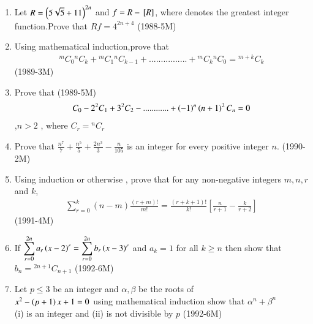 \documentclass[journal,12pt,twocolumn]{IEEEtran}
\theoremstyle{remark}
\begin{document}
\begin{enumerate}
	    \item Let $ R =\left(5\sqrt{5}+11\right)^{2n} $ and $ f = R -{}\left[R\right] $, where \sbrak{} denotes the greatest integer function.Prove  that $ Rf =4^{2n+4 } $  \hfill {(1988-5M)}


	    \item Using mathematical induction,prove that
		    \begin{align*} {}^mC_0{}^nC_k +{}^mC_1{}^nC_{k-1}+................+{}^mC_k{}^nC_0 ={}^{m+k}C_k \end{align*}  \hfill{(1989-3M)}


	    \item Prove that \hfill{(1989-5M)}
		    \begin{align*} 
		    C_0-2^2C_1+3^2C_2-............+\left(-1\right)^n\left(n+1\right)^2C_n =0
		    \end{align*},$n>2$ , where $C_r={}^nC_r$
		    

	    \item Prove that   $ \frac{n^7}{7}+\frac{n^5}{5}+\frac{2n^3}{3}-\frac{n}{105}$ is an integer for every positive integer $ n$. \hfill{(1990-2M)}


	    \item Using induction or otherwise , prove that for any non-negative integers $m,n,r$ and $ k$,
		    \begin{align*} 
			    \sum_{r=0}^{k}(n-m)\frac{(r+m)!}{m!}= \frac{(r+k+1)!}{k!}[\frac{n}{r+1}-\frac{k}{r+2}]
		    \end{align*}
		     \hfill{(1991-4M)} 

	     \item If $ \displaystyle\sum_{r=0}^{2n} a_r \left(x-2\right)^r=\displaystyle\sum_{r=0}^{2n}b_r \left(x-3\right)^r $ and $ a_k =1 $ for all $k \geq  n$ then show that $ b_n = {}^{2n+1}C_{n+1} $ \hfill{(1992-6M)}

	    \item Let $ p \leq 3 $ be an integer and $ \alpha , \beta $ be  the roots of\\ $ x^2-\left(p+1\right)x+1=0 $ using mathematical induction show that $ \alpha^n  + \beta^n $\\ (i) is an integer and   
		    (ii) is not divisible by $ p $       \hfill{(1992-6M)}
		    
 \end{enumerate}
    
    
\end{document}
